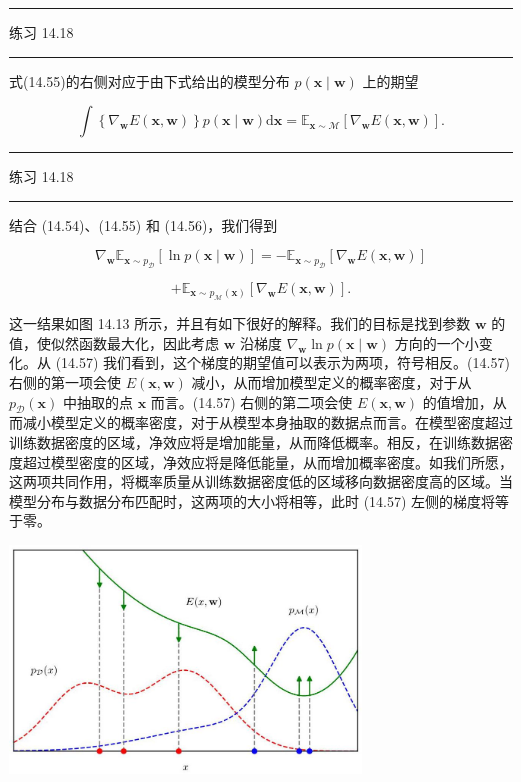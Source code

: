 \documentclass[10pt]{article}
\newcommand{\HRule}{\begin{center}\rule{0.9\linewidth}{0.2mm}\end{center}}
\begin{document}
\HRule

练习 14.18

\HRule

式(14.55)的右侧对应于由下式给出的模型分布 \(p\left( {\mathbf{x} \mid  \mathbf{w}}\right)\) 上的期望

\[
\int \left\{  {{\nabla }_{\mathbf{w}}E\left( {\mathbf{x},\mathbf{w}}\right) }\right\}  p\left( {\mathbf{x} \mid  \mathbf{w}}\right) \mathrm{d}\mathbf{x} = {\mathbb{E}}_{\mathbf{x} \sim  \mathcal{M}}\left\lbrack  {{\nabla }_{\mathbf{w}}E\left( {\mathbf{x},\mathbf{w}}\right) }\right\rbrack  . \tag{14.56}
\]

\HRule

练习 14.18

\HRule

结合 (14.54)、(14.55) 和 (14.56)，我们得到

\[
{\nabla }_{\mathbf{w}}{\mathbb{E}}_{\mathbf{x} \sim  {p}_{\mathcal{D}}}\left\lbrack  {\ln p\left( {\mathbf{x} \mid  \mathbf{w}}\right) }\right\rbrack   =  - {\mathbb{E}}_{\mathbf{x} \sim  {p}_{\mathcal{D}}}\left\lbrack  {{\nabla }_{\mathbf{w}}E\left( {\mathbf{x},\mathbf{w}}\right) }\right\rbrack
\]

\[
+ {\mathbb{E}}_{\mathbf{x} \sim  {p}_{\mathcal{M}}\left( \mathbf{x}\right) }\left\lbrack  {{\nabla }_{\mathbf{w}}E\left( {\mathbf{x},\mathbf{w}}\right) }\right\rbrack  . \tag{14.57}
\]

这一结果如图 14.13 所示，并且有如下很好的解释。我们的目标是找到参数 \(\mathbf{w}\) 的值，使似然函数最大化，因此考虑 \(\mathbf{w}\) 沿梯度 \({\nabla }_{\mathbf{w}}\ln p\left( {\mathbf{x} \mid  \mathbf{w}}\right)\) 方向的一个小变化。从 (14.57) 我们看到，这个梯度的期望值可以表示为两项，符号相反。(14.57) 右侧的第一项会使 \(E\left( {\mathbf{x},\mathbf{w}}\right)\) 减小，从而增加模型定义的概率密度，对于从 \({p}_{\mathcal{D}}\left( \mathbf{x}\right)\) 中抽取的点 \(\mathbf{x}\) 而言。(14.57) 右侧的第二项会使 \(E\left( {\mathbf{x},\mathbf{w}}\right)\) 的值增加，从而减小模型定义的概率密度，对于从模型本身抽取的数据点而言。在模型密度超过训练数据密度的区域，净效应将是增加能量，从而降低概率。相反，在训练数据密度超过模型密度的区域，净效应将是降低能量，从而增加概率密度。如我们所愿，这两项共同作用，将概率质量从训练数据密度低的区域移向数据密度高的区域。当模型分布与数据分布匹配时，这两项的大小将相等，此时 (14.57) 左侧的梯度将等于零。

\begin{center}
\includegraphics[max width=0.7\textwidth]{images/0194e279-9b28-703a-88f4-c3ac21e2010d_473_571_346_930_603_0.jpg}
\end{center}
\hspace*{3em} 
\end{document}
